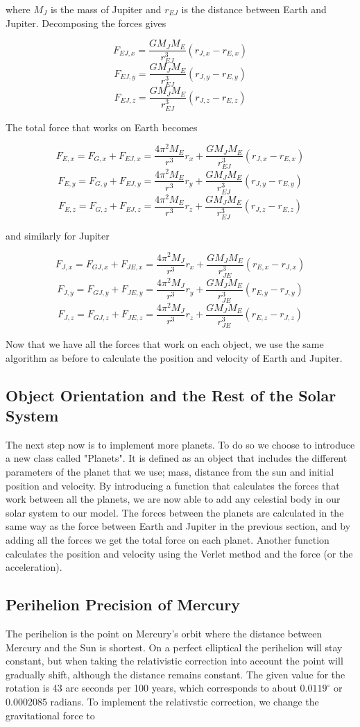 \documentclass{article}
\begin{document}
where $M_J$ is the mass of Jupiter and $r_{EJ}$ is the distance between Earth and Jupiter. Decomposing the forces gives

$$F_{EJ,x}=\frac{GM_JM_E}{r_{EJ}^3}(r_{J,x}-r_{E,x})$$
$$F_{EJ,y}=\frac{GM_JM_E}{r_{EJ}^3}(r_{J,y}-r_{E,y})$$
$$F_{EJ,z}=\frac{GM_JM_E}{r_{EJ}^3}(r_{J,z}-r_{E,z})$$

The total force that works on Earth becomes

$$F_{E,x}=F_{G,x}+F_{EJ,x}=\frac{4\pi^2M_E}{r^3}r_x+\frac{GM_JM_E}{r_{EJ}^3}(r_{J,x}-r_{E,x})$$
$$F_{E,y}=F_{G,y}+F_{EJ,y}=\frac{4\pi^2M_E}{r^3}r_y+\frac{GM_JM_E}{r_{EJ}^3}(r_{J,y}-r_{E,y})$$
$$F_{E,z}=F_{G,z}+F_{EJ,z}=\frac{4\pi^2M_E}{r^3}r_z+\frac{GM_JM_E}{r_{EJ}^3}(r_{J,z}-r_{E,z})$$

and similarly for Jupiter

$$F_{J,x}=F_{GJ,x}+F_{JE,x}=\frac{4\pi^2M_J}{r^3}r_x+\frac{GM_JM_E}{r_{JE}^3}(r_{E,x}-r_{J,x})$$
$$F_{J,y}=F_{GJ,y}+F_{JE,y}=\frac{4\pi^2M_J}{r^3}r_y+\frac{GM_JM_E}{r_{JE}^3}(r_{E,y}-r_{J,y})$$
$$F_{J,z}=F_{GJ,z}+F_{JE,z}=\frac{4\pi^2M_J}{r^3}r_z+\frac{GM_JM_E}{r_{JE}^3}(r_{E,z}-r_{J,z})$$

Now that we have all the forces that work on each object, we use the same algorithm as before to calculate the position and velocity of Earth and Jupiter.

\subsection{Object Orientation and the Rest of the Solar System}
The next step now is to implement more planets. To do so we choose to introduce a new class called "Planets". It is defined as an object that includes the different parameters of the planet that we use; mass, distance from the sun and initial position and velocity. By introducing a function that calculates the forces that work between all the planets, we are now able to add any celestial body in our solar system to our model. The forces between the planets are calculated in the same way as the force between Earth and Jupiter in the previous section, and by adding all the forces we get the total force on each planet. Another function calculates the position and velocity using the Verlet method and the force (or the acceleration).

\subsection{Perihelion Precision of Mercury}
The perihelion is the point on Mercury's orbit where the distance between Mercury and the Sun is shortest. On a perfect elliptical the perihelion will stay constant, but when taking the relativistic correction into account the point will gradually shift, although the distance remains constant. The given value for the rotation is 43 arc seconds per 100 years, which corresponds to about $0.0119^{\circ}$ or 0.0002085 radians. To implement the relativstic correction, we change the gravitational force to
\end{document}
